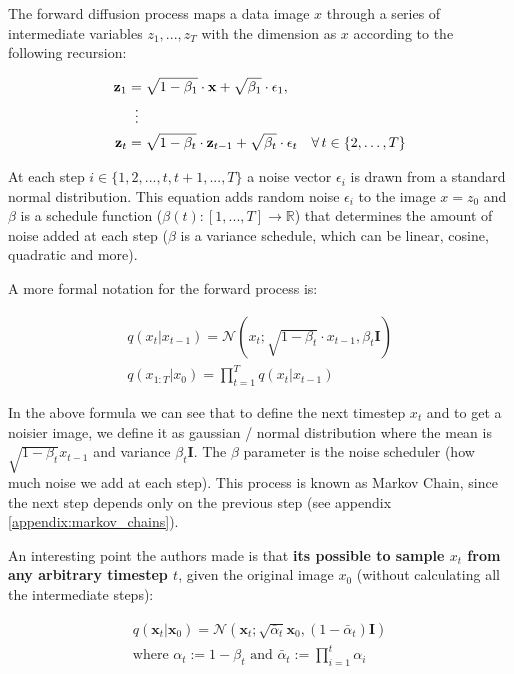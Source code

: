 The forward diffusion process maps a data image $x$ through a series of intermediate variables $z_1, ..., z_T$ with the dimension as $x$ according to the following recursion:

\begin{equation}
    \begin{aligned}
    \mathbf{z}_1 &= \sqrt{1 - \beta_1} \cdot \mathbf{x} + \sqrt{\beta_1} \cdot \epsilon_1, \\
    &\;\;\vdots \notag \\
    \mathbf{z}_t &= \sqrt{1 - \beta_t} \cdot \mathbf{z}_{t-1} + \sqrt{\beta_t} \cdot \epsilon_t \quad \forall \, t \in \{2, \ldots, T\}
    \end{aligned}
\end{equation}

At each step $i \in \{1, 2, ..., t, t+1, ..., T\}$ a noise vector $\epsilon_i$ is drawn from a standard normal distribution. This equation adds random noise $\epsilon_i$ to the image $x = z_0$ and $\beta$ is a schedule function ($\beta(t):[1, ..., T] \rightarrow \mathbb{R}$) that determines the amount of noise added at each step ($\beta$ is a variance schedule, which can be linear, cosine, quadratic and more). 

A more formal notation for the forward process is:

\begin{equation*}
    \begin{aligned}
        q(x_t | x_{t-1}) = \mathcal{N}(x_t; \sqrt{1-\beta_t} \cdot x_{t-1}, \beta_t \mathbf{I}) \\
        q(x_{1:T} | x_0) = \prod_{t=1}^{T} q(x_t | x_{t-1})
    \end{aligned}
\end{equation*}

In the above formula we can see that to define the next timestep $x_t$ and to get a noisier image, we define it as gaussian / normal distribution where the mean is $\sqrt{1-\beta_t} x_{t-1}$ and variance $\beta_t \mathbf{I}$. The $\beta$ parameter is the noise scheduler (how much noise we add at each step). This process is known as Markov Chain, since the next step depends only on the previous step (see appendix \ref{appendix:markov_chains}).

An interesting point the authors made is that \textbf{its possible to sample $x_t$ from any arbitrary timestep $t$}, given the original image $x_0$ (without calculating all the intermediate steps):

\begin{equation}
    \begin{aligned}
    q(\mathbf{x}_t|\mathbf{x}_0) = \mathcal{N}(\mathbf{x}_t; \sqrt{\bar{\alpha}_t}\mathbf{x}_0, (1 - \bar{\alpha}_t)\mathbf{I}) \\
    \text{where } \alpha_t := 1 - \beta_t \text{ and } \bar{\alpha}_t := \prod_{i=1}^{t} \alpha_i
    \end{aligned}
    \label{eq:forward_diffusion}
\end{equation}

